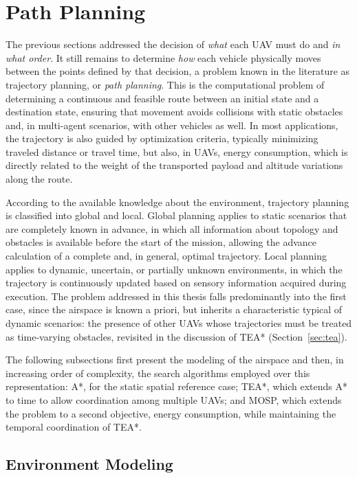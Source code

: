 \section{Path Planning}\label{sec:pathplanning}

The previous sections addressed the decision of \emph{what} each UAV must do and \emph{in what order}. It still remains to determine \emph{how} each vehicle physically moves between the points defined by that decision, a problem known in the literature as trajectory planning, or \textit{path planning}. This is the computational problem of determining a continuous and feasible route between an initial state and a destination state, ensuring that movement avoids collisions with static obstacles and, in multi-agent scenarios, with other vehicles as well. In most applications, the trajectory is also guided by optimization criteria, typically minimizing traveled distance or travel time, but also, in UAVs, energy consumption, which is directly related to the weight of the transported payload and altitude variations along the route.

According to the available knowledge about the environment, trajectory planning is classified into global and local. Global planning applies to static scenarios that are completely known in advance, in which all information about topology and obstacles is available before the start of the mission, allowing the advance calculation of a complete and, in general, optimal trajectory. Local planning applies to dynamic, uncertain, or partially unknown environments, in which the trajectory is continuously updated based on sensory information acquired during execution. The problem addressed in this thesis falls predominantly into the first case, since the airspace is known a priori, but inherits a characteristic typical of dynamic scenarios: the presence of other UAVs whose trajectories must be treated as time-varying obstacles, revisited in the discussion of TEA* (Section~\ref{sec:tea}).

The following subsections first present the modeling of the airspace and then, in increasing order of complexity, the search algorithms employed over this representation: A*, for the static spatial reference case; TEA*, which extends A* to time to allow coordination among multiple UAVs; and MOSP, which extends the problem to a second objective, energy consumption, while maintaining the temporal coordination of TEA*.

\subsection{Environment Modeling}

